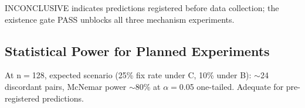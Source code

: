 INCONCLUSIVE indicates predictions registered before data collection; the existence
gate PASS unblocks all three mechanism experiments.

\subsection{Statistical Power for Planned Experiments}

At n$=$128, expected scenario (25\% fix rate under C, 10\% under B): $\sim$24 discordant
pairs, McNemar power $\sim$80\% at $\alpha=$0.05 one-tailed. Adequate for pre-registered predictions.
